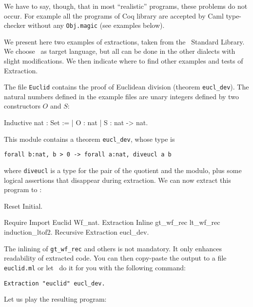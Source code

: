 We have to say, though, that in most ``realistic'' programs, these
problems do not occur. For example all the programs of Coq library are
accepted by Caml type-checker without any {\tt Obj.magic} (see examples below).




We present here two examples of extractions, taken from the 
\Coq\ Standard Library. We choose \ocaml\ as target language, 
but all can be done in the other dialects with slight modifications.
We then indicate where to find other examples and tests of Extraction.


The file {\tt Euclid} contains the proof of Euclidean division
(theorem {\tt eucl\_dev}). The natural numbers defined in the example
files are unary integers defined by two constructors $O$ and $S$:
\begin{coq_example*}
Inductive nat : Set :=
  | O : nat
  | S : nat -> nat.
\end{coq_example*}

This module contains a theorem {\tt eucl\_dev}, whose type is
\begin{verbatim}
forall b:nat, b > 0 -> forall a:nat, diveucl a b
\end{verbatim}
where {\tt diveucl} is a type for the pair of the quotient and the
modulo, plus some logical assertions that disappear during extraction.
We can now extract this program to \ocaml:

\begin{coq_eval}
Reset Initial.
\end{coq_eval}
\begin{coq_example}
Require Import Euclid Wf_nat.
Extraction Inline gt_wf_rec lt_wf_rec induction_ltof2.
Recursive Extraction eucl_dev.
\end{coq_example}

The inlining of {\tt gt\_wf\_rec} and others is not
mandatory. It only enhances readability of extracted code.
You can then copy-paste the output to a file {\tt euclid.ml} or let 
\Coq\ do it for you with the following command: 

\begin{verbatim}
Extraction "euclid" eucl_dev.
\end{verbatim}

Let us play the resulting program:

